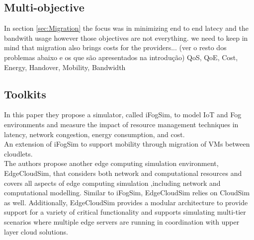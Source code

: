 



\subsection{Multi-objective}
\label{sec:Multiobjective}
In section \ref{sec:Migration} the focus was in minimizing end to end latecy and the bandwith usage however those objectives are not everything. we need to keep in mind that migration also brings costs for the providers... (ver o resto dos problemas abaixo e os que são apresentados na introdução)
QoS, QoE, Cost, Energy, Handover, Mobility, Bandwidth



\subsection{Toolkits}
\label{sec:Toolkits}

\cite{gupta2017ifogsim}
In this paper they propose a simulator, called iFogSim, to model IoT and Fog environments and measure the impact of resource management techniques in latency, network congestion, energy consumption, and cost.\\

\cite{Lopes2017}
An extension of iFogSim to support mobility through migration of VMs between cloudlets.\\

\cite{sonmez2017edgecloudsim}
The authors propose another edge computing simulation environment, EdgeCloudSim, that considers both network and computational resources and covers all aspects of edge computing simulation ,including network and computational modelling. Similar to iFogSim, EdgeCloudSim relies on CloudSim as well. Additionally, EdgeCloudSim provides a modular architecture to provide support for a variety of critical functionality and supports simulating multi-tier scenarios where multiple edge servers are running in coordination with upper layer cloud solutions.

\vfill\pagebreak
